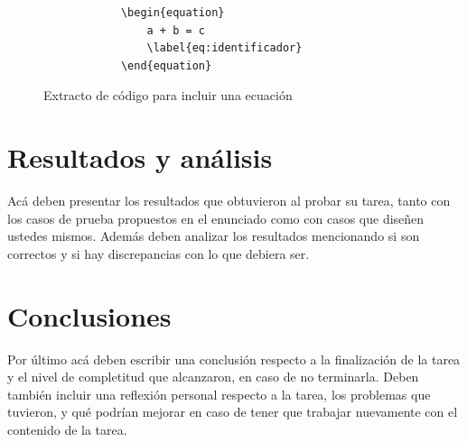 \documentclass[a4paper]{article}
\begin{document}
\begin{figure}[!htbp]
    \centering
    \begin{minipage}{0.7\textwidth}
        \begin{verbatim}
            \begin{equation}
                a + b = c
                \label{eq:identificador}
            \end{equation}
        \end{verbatim}
    \end{minipage}
    \caption{Extracto de código para incluir una ecuación}
    \label{fig:v_ecuacion}
\end{figure}

\section{Resultados y análisis}
{\color{red} Acá deben presentar los resultados que obtuvieron al probar su tarea, tanto con los casos de prueba propuestos en el enunciado como con casos que diseñen ustedes mismos. Además deben analizar los resultados mencionando si son correctos y si hay discrepancias con lo que debiera ser.}

\section{Conclusiones}
{\color{red} Por último acá deben escribir una conclusión respecto a la finalización de la tarea y el nivel de completitud que alcanzaron, en caso de no terminarla. Deben también incluir una reflexión personal respecto a la tarea, los problemas que tuvieron, y qué podrían mejorar en caso de tener que trabajar nuevamente con el contenido de la tarea.}
\end{document}
